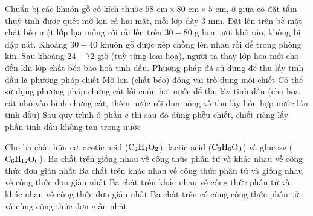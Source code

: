 \documentclass[12pt,a4paper]{article}
\begin{document}
\begin{ex}
Chuẩn bị các khuôn gỗ có kích thước $58\text{ cm} \times 80\text{ cm} \times 5\text{ cm}$, ở giữa có đặt tấm thuỷ tinh được quét mỡ lợn cả hai mặt, mỗi lớp dày $3\text{ mm}$. Đặt lên trên bề mặt chất béo một lớp lụa mỏng rồi rải lên trên $30 - 80\text{ g}$ hoa tươi khô ráo, không bị dập nát. Khoảng $30 - 40$ khuôn gỗ được xếp chồng lên nhau rồi để trong phòng kín. Sau khoảng $24 - 72$ giờ (tuỳ từng loại hoa), người ta thay lớp hoa mới cho đến khi lớp chất béo bão hoà tinh dầu.
\choiceTF
{\True Phương pháp đã sử dụng để thu lấy tinh dầu là phương pháp chiết}
{\True Mỡ lợn (chất béo) đóng vai trò dung môi chiết}
{\True Có thể sử dụng phương pháp chưng cất lôi cuốn hơi nước để thu lấy tinh dầu (cho hoa cắt nhỏ vào bình chưng cất, thêm nước rồi đun nóng và thu lấy hỗn hợp nước lẫn tinh dầu)}
{\True Sau quy trình ở phần c thì sau đó dùng phễu chiết, chiết riêng lấy phần tinh dầu không tan trong nước}

\end{ex}

\begin{ex}
Cho ba chất hữu cơ: acetic acid ($\ce{C2H4O2}$), lactic acid ($\ce{C3H6O3}$) và glucose ($\ce{C6H12O6}$).
\choiceTF
{Ba chất trên giống nhau về công thức phân tử và khác nhau về công thức đơn giản nhất}
{\True Ba chất trên khác nhau về công thức phân tử và giống nhau về công thức đơn giản nhất}
{Ba chất trên khác nhau về công thức phân tử và khác nhau về công thức đơn giản nhất}
{Ba chất trên có cùng công thức phân tử và cùng công thức đơn giản nhất}

\end{ex}
\end{document}
